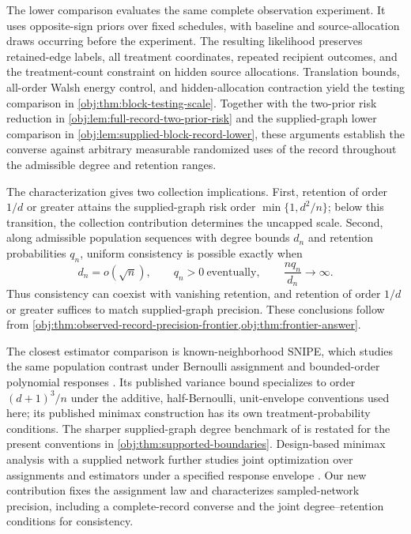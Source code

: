 The lower comparison evaluates the same complete observation experiment. It uses opposite-sign priors over fixed schedules, with baseline and source-allocation draws occurring before the experiment. The resulting likelihood preserves retained-edge labels, all treatment coordinates, repeated recipient outcomes, and the treatment-count constraint on hidden source allocations. Translation bounds, all-order Walsh energy control, and hidden-allocation contraction yield the testing comparison in \cref{obj:thm:block-testing-scale}. Together with the two-prior risk reduction in \cref{obj:lem:full-record-two-prior-risk} and the supplied-graph lower comparison in \cref{obj:lem:supplied-block-record-lower}, these arguments establish the converse against arbitrary measurable randomized uses of the record throughout the admissible degree and retention ranges.

The characterization gives two collection implications. First, retention of order \(1/d\) or greater attains the supplied-graph risk order \(\min\{1,d^2/n\}\); below this transition, the collection contribution determines the uncapped scale. Second, along admissible population sequences with degree bounds \(d_n\) and retention probabilities \(q_n\), uniform consistency is possible exactly when
\[
d_n=o(\sqrt n),
\qquad
q_n>0\ \text{eventually},
\qquad
\frac{nq_n}{d_n}\longrightarrow\infty.
\]
Thus consistency can coexist with vanishing retention, and retention of order \(1/d\) or greater suffices to match supplied-graph precision. These conclusions follow from \cref{obj:thm:observed-record-precision-frontier,obj:thm:frontier-answer}.

The closest estimator comparison is known-neighborhood SNIPE, which studies the same population contrast under Bernoulli assignment and bounded-order polynomial responses \citep[Sections 3--5; Theorems 1--2]{CortezRodriguezEichhornYu2023SNIPE}. Its published variance bound specializes to order \((d+1)^3/n\) under the additive, half-Bernoulli, unit-envelope conventions used here; its published minimax construction has its own treatment-probability conditions. The sharper supplied-graph degree benchmark of \citet[Theorem \texttt{thm:degree-frontier}; non-archival research note]{CausalSmithKnownGraph2026} is restated for the present conventions in \cref{obj:thm:supported-boundaries}. Design-based minimax analysis with a supplied network further studies joint optimization over assignments and estimators under a specified response envelope \citep[Corollary 5.4]{KandirosHarshawSavje2026DesignBasedMinimax}. Our new contribution fixes the assignment law and characterizes sampled-network precision, including a complete-record converse and the joint degree--retention conditions for consistency.

